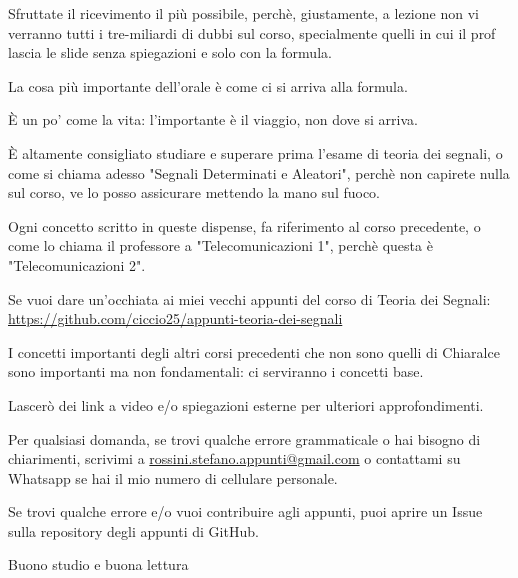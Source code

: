 Sfruttate il ricevimento il più possibile, perchè, giustamente, a lezione non vi verranno tutti i tre-miliardi di dubbi sul corso, 
specialmente quelli in cui il prof lascia le slide senza spiegazioni e solo con la formula. \newline 

La cosa più importante dell'orale è come ci si arriva alla formula. \newline 

È un po' come la vita: l'importante è il viaggio, non dove si arriva. \newline 

È altamente consigliato studiare e superare prima l’esame di teoria dei segnali, o come si chiama adesso "Segnali Determinati e Aleatori", 
perchè non capirete nulla sul corso, ve lo posso assicurare mettendo la mano sul fuoco. \newline 

Ogni concetto scritto in queste dispense, fa riferimento al corso precedente, o come lo chiama il professore a "Telecomunicazioni 1", perchè questa è "Telecomunicazioni 2". \newline 

Se vuoi dare un'occhiata ai miei vecchi appunti del corso di Teoria dei Segnali: \\
\url{https://github.com/ciccio25/appunti-teoria-dei-segnali} \newline 

I concetti importanti degli altri corsi precedenti che non sono quelli di Chiaralce sono importanti ma non fondamentali: ci serviranno i concetti base. \newline 

Lascerò dei link a video e/o spiegazioni esterne per ulteriori approfondimenti. \newline 

Per qualsiasi domanda, se trovi qualche errore grammaticale o hai bisogno di chiarimenti, scrivimi a \href{mailto:rossini.stefano.appunti@gmail.com}{rossini.stefano.appunti@gmail.com} o contattami su Whatsapp se hai il mio numero di cellulare personale. \newline

Se trovi qualche errore e/o vuoi contribuire agli appunti, 
puoi aprire un Issue sulla repository degli appunti di GitHub. \newline 

Buono studio e buona lettura \newline

\newpage 





